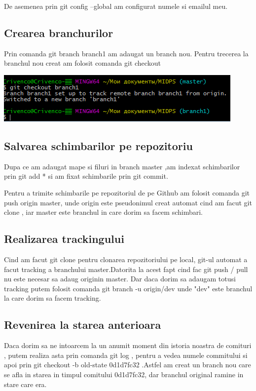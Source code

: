 \documentclass[a4paper, 12pt]{article}
\begin{document}
De asemenea prin git config --global am configurat numele si emailul meu. 

\subsection{Crearea branchurilor}
Prin comanda git branch branch1 am adaugat un branch nou.
Pentru trecerea la branchul nou creat am folosit comanda git checkout

\includegraphics*{git_checkout}
\subsection{Salvarea schimbarilor pe repozitoriu}
Dupa ce am adaugat mape si filuri in branch master ,am indexat schimbarilor prin git add *  si am fixat schimbarile prin git commit.

Pentru a trimite schimbarile pe repozitoriul de pe Github am folosit comanda git push origin master, unde origin este pseudonimul creat automat  cind am facut git clone , iar master este branchul in care dorim sa facem schimbari.

\subsection{Realizarea trackingului}
Cind am facut git clone pentru clonarea repozitoriului pe local, git-ul automat a facut tracking a branchului master.Datorita la acest fapt cind fac git push / pull nu este necesar sa adaug originin master.
Dar daca dorim sa adaugam totusi tracking putem folosit comanda git branch -u origin/dev unde "dev" este branchul la care dorim sa facem tracking.

\subsection{Revenirea la starea anterioara }
Daca dorim sa ne intoarcem la un anumit moment din istoria noastra de comituri  , putem realiza asta prin comanda git log , pentru a vedea numele commitului si apoi prin git checkout -b old-state 0d1d7fc32 .Astfel am creat un branch nou care se afla in starea in timpul comitului 0d1d7fc32, dar branchul original ramine in stare care era.
\end{document}
